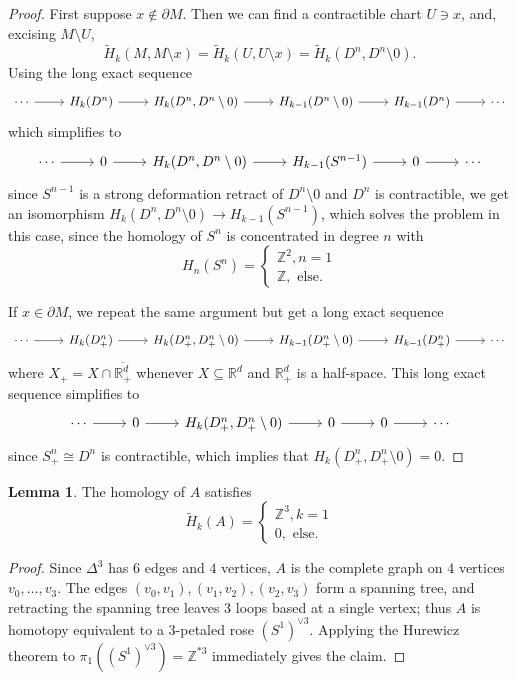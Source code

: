 \documentclass[10pt]{article}
\newcommand{\ZZ}{\mathbb{Z}}
\newcommand{\RR}{\mathbb{R}}
\theoremstyle{definition}
\newtheorem{lemma}{Lemma}[exer]
\begin{document}
\begin{proof}
First suppose $x \notin \partial M$. Then we can find a contractible chart $U \ni x$, and, excising $M \setminus U$,
$$\widetilde H_k(M, M \setminus x) = \widetilde H_k(U, U \setminus x) = \widetilde H_k(D^n, D^n \setminus 0).$$
Using the long exact sequence
$$\begin{tikzcd}
\cdots \arrow[r] & H_k(D^n) \arrow[r] & H_k(D^n, D^n \setminus 0) \arrow[r] & H_{k-1}(D^n \setminus 0) \arrow[r] & H_{k-1}(D^n) \arrow[r]& \cdots
\end{tikzcd}$$
which simplifies to $$\begin{tikzcd}
\cdots \arrow[r] & 0 \arrow[r] & H_k(D^n, D^n \setminus 0) \arrow[r] & H_{k-1}(S^{n-1}) \arrow[r] & 0 \arrow[r] &\cdots
\end{tikzcd}$$
since $S^{n-1}$ is a strong deformation retract of $D^n \setminus 0$ and $D^n$ is contractible, we get an isomorphism $H_k(D^n, D^n \setminus 0) \to H_{k-1}(S^{n-1})$, which solves the problem in this case, since the homology of $S^n$ is concentrated in degree $n$ with
$$H_n(S^n) = \begin{cases}
\ZZ^2, n = 1\\
\ZZ, \text{ else}.
\end{cases}$$

If $x \in \partial M$, we repeat the same argument but get a long exact sequence
$$\begin{tikzcd}
\cdots \arrow[r] & H_k(D^n_+) \arrow[r] & H_k(D^n_+, D^n_+ \setminus 0) \arrow[r] & H_{k-1}(D^n_+ \setminus 0) \arrow[r] & H_{k-1}(D^n_+) \arrow[r]& \cdots
\end{tikzcd}$$
where $X_+ = X \cap \overline{\RR^d_+}$ whenever $X \subseteq \RR^d$ and $\RR^d_+$ is a half-space. This long exact sequence simplifies to
$$\begin{tikzcd}
\cdots \arrow[r] & 0 \arrow[r] & H_k(D^n_+, D^n_+ \setminus 0) \arrow[r] &0 \arrow[r] & 0 \arrow[r]& \cdots
\end{tikzcd}$$
since $S^n_+ \cong D^n$ is contractible, which implies that $H_k(D^n_+, D^n_+ \setminus 0) = 0$.
\end{proof}
\begin{lemma}
The homology of $A$ satisfies
$$\widetilde H_k(A) = \begin{cases}
\ZZ^3, k = 1\\
0, \text{ else}.
\end{cases}$$
\end{lemma}
\begin{proof}
Since $\Delta^3$ has $6$ edges and $4$ vertices, $A$ is the complete graph on $4$ vertices $v_0, \dots, v_3$.
The edges $(v_0, v_1), (v_1, v_2), (v_2, v_3)$ form a spanning tree, and retracting the spanning tree leaves $3$ loops based at a single vertex; thus $A$ is homotopy equivalent to a $3$-petaled rose $(S^1)^{\vee 3}$.
Applying the Hurewicz theorem to $\pi_1((S^1)^{\vee 3}) = \ZZ^{*3}$ immediately gives the claim.
\end{proof}
\end{document}
